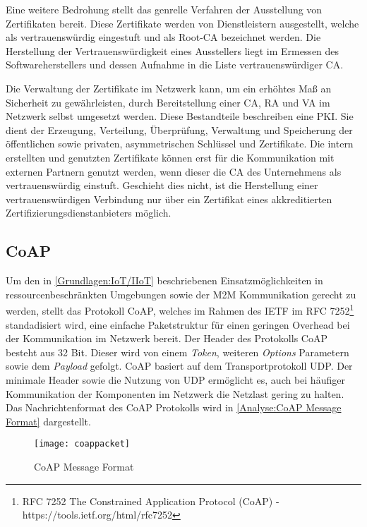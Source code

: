 Eine weitere Bedrohung stellt das genrelle Verfahren der Ausstellung von Zertifikaten bereit. Diese Zertifikate werden von Dienstleistern ausgestellt, welche als vertrauenswürdig eingestuft und als Root-\ac{CA} bezeichnet werden. Die Herstellung der Vertrauenswürdigkeit eines Ausstellers liegt im Ermessen des Softwareherstellers und dessen Aufnahme in die Liste vertrauenswürdiger \ac{CA}. 

Die Verwaltung der Zertifikate im Netzwerk kann, um ein erhöhtes Maß an Sicherheit zu gewährleisten, durch Bereitstellung einer \ac{CA}, \ac{RA} und \ac{VA} im Netzwerk selbst umgesetzt werden. Diese Bestandteile beschreiben eine \ac{PKI}. Sie dient der Erzeugung, Verteilung, Überprüfung, Verwaltung und Speicherung der öffentlichen sowie privaten, asymmetrischen Schlüssel und Zertifikate. Die intern erstellten und genutzten Zertifikate können erst für die Kommunikation mit externen Partnern genutzt werden, wenn dieser die \ac{CA} des Unternehmens als vertrauenswürdig einstuft. Geschieht dies nicht, ist die Herstellung einer vertrauenswürdigen Verbindung nur über ein Zertifikat eines akkreditierten Zertifizierungsdienstanbieters möglich.

\subsection{\ac{CoAP}}
Um den in \autoref{Grundlagen:IoT/IIoT} beschriebenen Einsatzmöglichkeiten in ressourcenbeschränkten Umgebungen sowie der \ac{M2M} Kommunikation gerecht zu werden, stellt das Protokoll \ac{CoAP}, welches im Rahmen des \ac{IETF} im RFC 7252\footnote{RFC 7252 The Constrained Application Protocol (CoAP) - https://tools.ietf.org/html/rfc7252} standadisiert wird, eine einfache Paketstruktur für einen geringen Overhead bei der Kommunikation im Netzwerk bereit. Der Header des Protokolls \ac{CoAP} besteht aus 32 Bit. Dieser wird von einem \textit{Token}, weiteren \textit{Options} Parametern sowie dem \textit{Payload} gefolgt. \ac{CoAP} basiert auf dem Transportprotokoll \ac{UDP}. Der minimale Header sowie die Nutzung von \ac{UDP} ermöglicht es, auch bei häufiger Kommunikation der Komponenten im Netzwerk die Netzlast gering zu halten. Das Nachrichtenformat des \ac{CoAP} Protokolls wird in \autoref{Analyse:CoAP Message Format} dargestellt.

\begin{figure}[h]
  \centering
  \texttt{[image: coappacket]}
  \caption{CoAP Message Format} 
  \label{Analyse:CoAP Message Format}
\end{figure}

